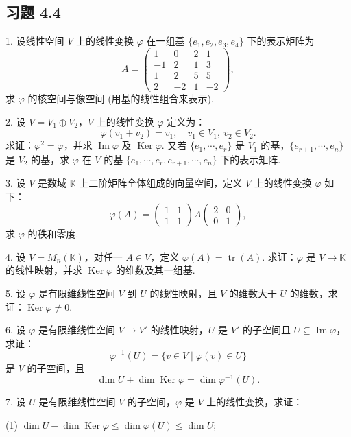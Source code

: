 \documentclass[UTF8,12pt,a4paper,fontset=fandol]{ctexart}
\begin{document}
\subsection*{习题 4.4}

1. 设线性空间 $V$ 上的线性变换 $\varphi$ 在一组基 $\{e_1,e_2,e_3,e_4\}$ 下的表示矩阵为
\[
A=\left(\begin{array}{rrrr}
1 & 0 & 2 & 1\\
-1 & 2 & 1 & 3\\
1 & 2 & 5 & 5\\
2 & -2 & 1 & -2
\end{array}\right),
\]
求 $\varphi$ 的核空间与像空间 (用基的线性组合来表示).

2. 设 $V=V_1\oplus V_2$，$V$ 上的线性变换 $\varphi$ 定义为：
\[
\varphi(v_1+v_2)=v_1,\quad v_1\in V_1,\ v_2\in V_2.
\]
求证：$\varphi^2=\varphi$，并求 $\operatorname{Im}\varphi$ 及 $\operatorname{Ker}\varphi$. 又若 $\{e_1,\cdots,e_r\}$ 是 $V_1$ 的基，$\{e_{r+1},\cdots,e_n\}$ 是 $V_2$ 的基，求 $\varphi$ 在 $V$ 的基 $\{e_1,\cdots,e_r,e_{r+1},\cdots,e_n\}$ 下的表示矩阵.

3. 设 $V$ 是数域 $\mathbb{K}$ 上二阶矩阵全体组成的向量空间，定义 $V$ 上的线性变换 $\varphi$ 如下：
\[
\varphi(A)=
\left(\begin{array}{cc}
1 & 1\\
1 & 1
\end{array}\right)
A
\left(\begin{array}{cc}
2 & 0\\
0 & 1
\end{array}\right),
\]
求 $\varphi$ 的秩和零度.

4. 设 $V=M_n(\mathbb{K})$，对任一 $A\in V$，定义 $\varphi(A)=\operatorname{tr}(A)$. 求证：$\varphi$ 是 $V\to\mathbb{K}$ 的线性映射，并求 $\operatorname{Ker}\varphi$ 的维数及其一组基.

5. 设 $\varphi$ 是有限维线性空间 $V$ 到 $U$ 的线性映射，且 $V$ 的维数大于 $U$ 的维数，求证：$\operatorname{Ker}\varphi\neq 0$.

6. 设 $\varphi$ 是有限维线性空间 $V\to V'$ 的线性映射，$U$ 是 $V'$ 的子空间且 $U\subseteq\operatorname{Im}\varphi$，求证：
\[
\varphi^{-1}(U)=\{v\in V\mid \varphi(v)\in U\}
\]
是 $V$ 的子空间，且
\[
\dim U+\dim\operatorname{Ker}\varphi=\dim\varphi^{-1}(U).
\]

7. 设 $U$ 是有限维线性空间 $V$ 的子空间，$\varphi$ 是 $V$ 上的线性变换，求证：

(1) $\dim U-\dim\operatorname{Ker}\varphi\leq \dim\varphi(U)\leq \dim U$;
\end{document}
